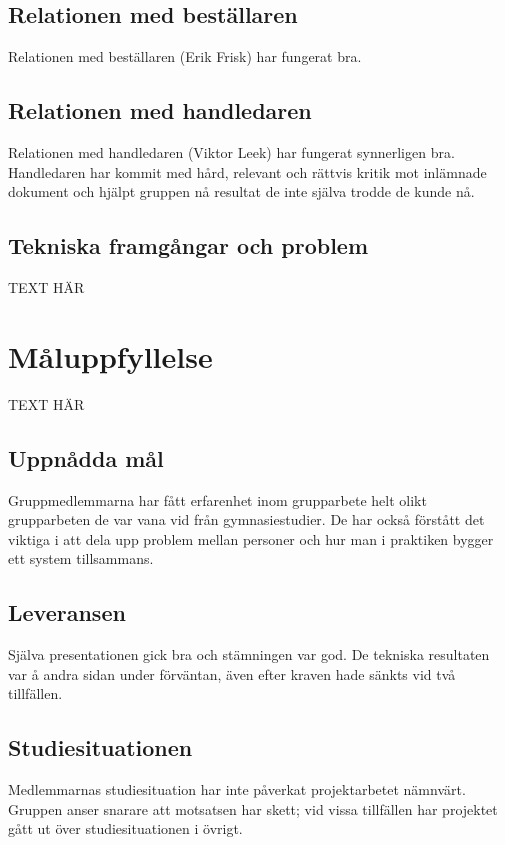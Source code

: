 \documentclass[10pt,oneside,swedish]{lips}
\begin{document}
\subsection{Relationen med beställaren}

Relationen med beställaren (Erik Frisk) har fungerat bra.

\subsection{Relationen med handledaren}

Relationen med handledaren (Viktor Leek) har fungerat synnerligen bra.
Handledaren har kommit med hård, relevant och rättvis kritik mot inlämnade
dokument och hjälpt gruppen nå resultat de inte själva trodde de kunde nå.

\subsection{Tekniska framgångar och problem}
 TEXT HÄR
\section{Måluppfyllelse}

TEXT HÄR

\subsection{Uppnådda mål}

Gruppmedlemmarna har fått erfarenhet inom grupparbete helt olikt grupparbeten de
var vana vid från gymnasiestudier. De har också förstått det viktiga i att dela
upp problem mellan personer och hur man i praktiken bygger ett system
tillsammans.

\subsection{Leveransen}

Själva presentationen gick bra och stämningen var god. De tekniska resultaten
var å andra sidan under förväntan, även efter kraven hade sänkts vid två
tillfällen.

\subsection{Studiesituationen}

Medlemmarnas studiesituation har inte påverkat projektarbetet nämnvärt. Gruppen
anser snarare att motsatsen har skett; vid vissa tillfällen har projektet gått
ut över studiesituationen i övrigt.
\end{document}
